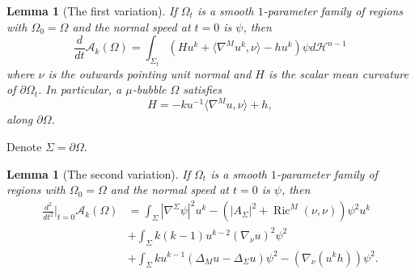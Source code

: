 \documentclass[11pt,letterpaper]{amsart}
\DeclareMathOperator{\Ric}{Ric}
\newcommand{\lp}{\langle}
\newcommand{\rp}{\rangle}
\newcommand{\mA}{\mathcal{A}}
\newcommand{\mH}{\mathcal{H}}
\newtheorem{lemma}[theorem]{Lemma}
\theoremstyle{definition}
\theoremstyle{remark}
\numberwithin{equation}{section}
\begin{document}
\begin{lemma}[The first variation]\label{first}
    If $\Omega_t$ is a smooth $1$-parameter family of regions with $\Omega_0=\Omega$ and the normal speed at $t=0$ is $\psi$, then
    \begin{equation*}
        \frac{d}{dt}\mA_{k}(\Omega)=\int_{\Sigma_t}\left(Hu^k+\lp\nabla^{M}u^k,\nu\rp-hu^k\right)\psi d\mH^{n-1}
    \end{equation*}
    where $\nu$ is the outwards pointing unit normal and $H$ is the scalar mean curvature of $\partial \Omega_t$. In particular, a $\mu$-bubble $\Omega$ satisfies
    \begin{equation*}
        H=-ku^{-1}\lp\nabla^{M}u,\nu\rp+h,
    \end{equation*}
    along $\partial\Omega$.
\end{lemma}
Denote $\Sigma=\partial\Omega.$
\begin{lemma}[The second variation]\label{second}
 If $\Omega_t$ is a smooth $1$-parameter family of regions with $\Omega_0=\Omega$ and the normal speed at $t=0$ is $\psi$, then
    \begin{equation*}
        \begin{split}
            \frac{d^2}{d t^2}\bigg|_{t=0}\mA_{k}(\Omega)&=\int_{\Sigma}|\nabla^{\Sigma}\psi|^2 u^k-\left(|A_{\Sigma}|^2+\Ric^M(\nu,\nu)\right)\psi^2 u^k\\
            &+\int_\Sigma k(k-1)u^{k-2}\left(\nabla_{\nu}u\right)^2\psi^2 \\
            &+\int_{\Sigma}ku^{k-1}\left(\Delta_M u-\Delta_{\Sigma} u\right)\psi^2-\left(\nabla_{\nu}(u^kh)\right)\psi^2.
        \end{split}
    \end{equation*}
\end{lemma}
\end{document}
